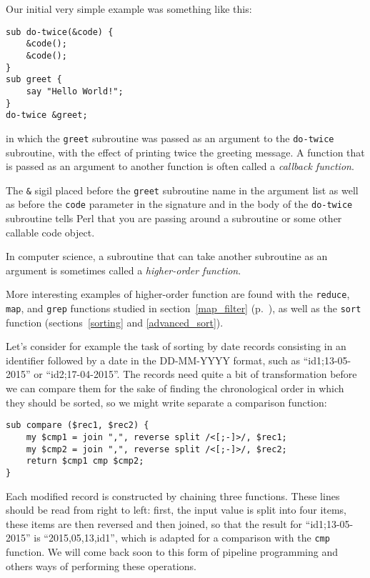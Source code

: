 Our initial very simple example was something 
like this:

\begin{verbatim}
sub do-twice(&code) {
    &code(); 
    &code();
}
sub greet {
    say "Hello World!";
}
do-twice &greet;
\end{verbatim}

in which the {\tt greet} subroutine was passed as an 
argument to the {\tt do-twice} subroutine, with the 
effect of printing twice the greeting message. A 
function that is passed as an argument to another function 
is often called a \emph{callback function}.

The \verb"&" sigil placed before the {\tt greet} 
subroutine name in the argument list as well as before 
the {\tt code} parameter in the signature and in the 
body of the {\tt do-twice} subroutine tells Perl 
that you are passing around a subroutine or some 
other callable code object.

In computer science, a subroutine that can take 
another subroutine as an argument is sometimes 
called a \emph{higher-order function}.

More interesting examples of higher-order function 
are found with the {\tt reduce}, {\tt map}, and
{\tt grep} functions studied in section~\ref{map_filter} 
(p.~\pageref{map_filter}), as well as the {\tt sort} 
function (sections~\ref{sorting} and \ref{advanced_sort}).

Let's consider for example the task of sorting by date 
records consisting in an identifier followed by a date 
in the DD-MM-YYYY format, such as ``id1;13-05-2015'' 
or ``id2;17-04-2015''. The records need quite a bit of 
transformation before we can compare them for the sake 
of finding the chronological order in which they should 
be sorted, so we might write separate a comparison 
function:

\begin{verbatim}
sub compare ($rec1, $rec2) {
    my $cmp1 = join ",", reverse split /<[;-]>/, $rec1;
    my $cmp2 = join ",", reverse split /<[;-]>/, $rec2;
    return $cmp1 cmp $cmp2;
}   
\end{verbatim}

Each modified record is constructed by chaining three 
functions. These lines should be read from right to left: 
first, the input value is split into four items, these 
items are then reversed and then joined, so that the result 
for ``id1;13-05-2015'' is ``2015,05,13,id1'', which is 
adapted for a comparison with the {\tt cmp} function. We 
will come back soon to this form of pipeline programming 
and others ways of performing these operations. 

